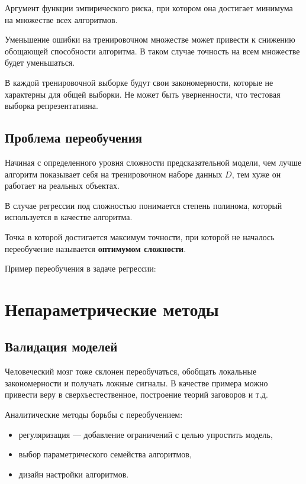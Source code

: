 Аргумент функции эмпирического риска, при котором она достигает минимума на
множестве всех алгоритмов.

Уменьшение ошибки на тренировочном множестве может привести к снижению
обощающей способности алгоритма. В таком случае точность на всем множестве
будет уменьшаться.

В каждой тренировочной выборке будут свои закономерности, которые не характерны
для общей выборки. Не может быть уверненности, что тестовая выборка
репрезентативна.

\subsection{Проблема переобучения}

Начиная с определенного уровня сложности предсказательной модели, чем лучше
алгоритм показывает себя на тренировочном наборе данных $D$, тем хуже он
работает на реальных объектах.

В случае регрессии под сложностью понимается степень полинома, который
используется в качестве алгоритма.

Точка в которой достигается максимум точности, при которой не началось
переобучение называется \textbf{оптимумом сложности}.

Пример переобучения в задаче регрессии:


\section{Непараметрические методы}

\subsection{Валидация моделей}

Человеческий мозг тоже склонен переобучаться, обобщать локальные закономерности
и получать ложные сигналы. В качестве примера можно привести веру в
сверхъестественное, построение теорий заговоров и т.д.

Аналитические методы борьбы с переобучением:
\begin{itemize}
    \item регуляризация --- добавление ограничений с целью упростить модель,
    \item выбор параметрического семейства алгоритмов,
    \item дизайн настройки алгоритмов.
\end{itemize}

